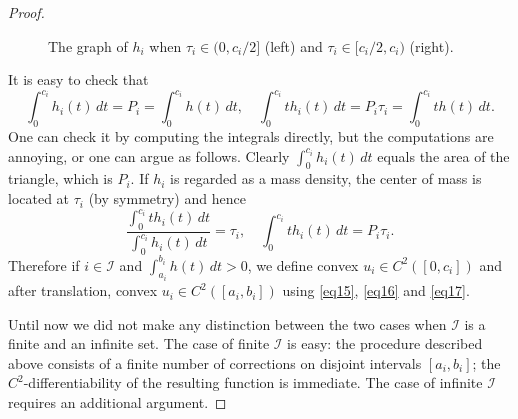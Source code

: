 \documentclass[intlimits,12pt,reqno]{amsart}
\theoremstyle{definition}
\begin{document}
\begin{proof}
\begin{figure}[!h]
\caption{The graph of $h_i$  when $\tau_i\in (0,c_i/2]$ (left) and $\tau_i\in [c_i/2, c_i)$ (right).}
\end{figure}




It is easy to check that
$$
\int_0^{c_i} h_i(t)\, dt=P_i=\int_0^{c_i} h(t)\, dt,
\quad
\int_0^{c_i}th_i(t)\, dt =P_i\tau_i=\int_0^{c_i} th(t)\, dt.
$$
One can check it by computing the integrals directly, but the computations are annoying, or one can argue as follows.
Clearly $\int_0^{c_i} h_i(t)\, dt$ equals the area of the triangle, which is $P_i$. If $h_i$ is regarded as a mass density, the center of mass is located at $\tau_i$ (by symmetry) and hence
$$
\frac{\int_0^{c_i} th_i(t)\, dt}{\int_0^{c_i} h_i(t)\, dt}=\tau_i,
\quad
\int_0^{c_i}th_i(t)\, dt=P_i\tau_i.
$$
Therefore if $i\in\mathcal{I}$ and $\int_{a_i}^{b_i} h(t)\, dt>0$, we define convex $u_i\in C^2([0,c_i])$ and after translation, convex $u_i\in C^2([a_i,b_i])$ using \eqref{eq15}, \eqref{eq16} and \eqref{eq17}.


Until now we did not make any distinction between the two cases when $\mathcal{I}$ is a finite and an infinite set. The case of finite $\mathcal{I}$ is easy: the procedure described above consists of a finite number of corrections on disjoint intervals $[a_i,b_i]$; the $C^2$-differentiability of the resulting function is immediate. The case of infinite $\mathcal{I}$ requires an additional argument. 


\end{proof}
\end{document}
